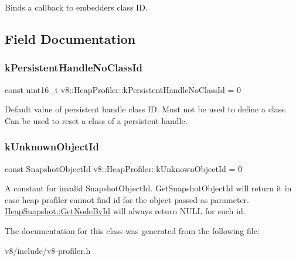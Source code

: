 Binds a callback to embedder\textquotesingle{}s class ID. 

\subsection{Field Documentation}
\mbox{\label{classv8_1_1HeapProfiler_a272c9af3ea5cd90a2737af3d22a7eb78}} 
\subsubsection{\texorpdfstring{k\+Persistent\+Handle\+No\+Class\+Id}{kPersistentHandleNoClassId}}
{\footnotesize\ttfamily const uint16\+\_\+t v8\+::\+Heap\+Profiler\+::k\+Persistent\+Handle\+No\+Class\+Id = 0\hspace{0.3cm}{\ttfamily [static]}}

Default value of persistent handle class ID. Must not be used to define a class. Can be used to reset a class of a persistent handle. \mbox{\label{classv8_1_1HeapProfiler_abf2b9d8facb18473f9b124ab8baf5786}} 
\subsubsection{\texorpdfstring{k\+Unknown\+Object\+Id}{kUnknownObjectId}}
{\footnotesize\ttfamily const Snapshot\+Object\+Id v8\+::\+Heap\+Profiler\+::k\+Unknown\+Object\+Id = 0\hspace{0.3cm}{\ttfamily [static]}}

A constant for invalid Snapshot\+Object\+Id. Get\+Snapshot\+Object\+Id will return it in case heap profiler cannot find id for the object passed as parameter. \mbox{\hyperlink{classv8_1_1HeapSnapshot_a0aec9c1535c27bc8b1b55579969203fc}{Heap\+Snapshot\+::\+Get\+Node\+By\+Id}} will always return N\+U\+LL for such id. 

The documentation for this class was generated from the following file\+:\begin{DoxyCompactItemize}
\item 
v8/include/v8-\/profiler.\+h\end{DoxyCompactItemize}
